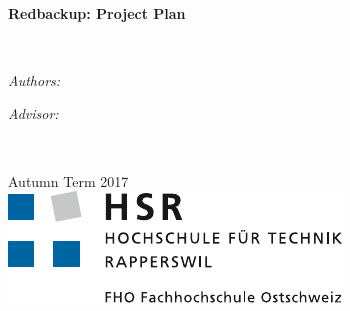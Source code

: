 

\usepackage{tabu}
\usepackage{diagbox}
\usepackage{float}
\usepackage{multicol}
\usepackage{url}



\frontmatter


\begin{titlepage}
\begin{center}
\vspace*{.06\textheight}

\HRule \\[0.4cm] %
{\huge \bfseries Redbackup: Project Plan\par}\vspace{0.4cm} %
\HRule \\[1.5cm] %

\begin{minipage}[t]{0.4\textwidth}
\begin{flushleft} \large
\emph{Authors:}\\
\authorname %
\end{flushleft}
\end{minipage}
\begin{minipage}[t]{0.4\textwidth}
\begin{flushright} \large
\emph{Advisor:} \\
\supname
\end{flushright}
\end{minipage}\\[3cm]

\vfill

{\large Autumn Term 2017}\\[4cm] %
\includegraphics{resources/logo_hsr} %

\vfill
\end{center}
\end{titlepage}


